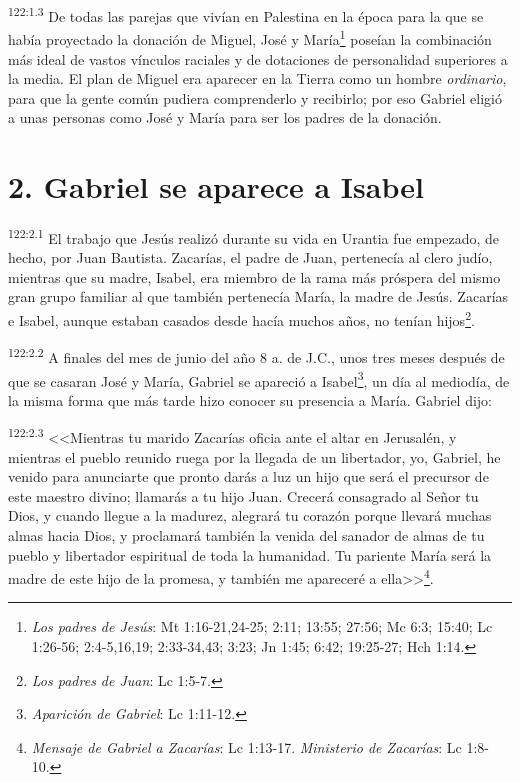 \par 
\textsuperscript{122:1.3} De todas las parejas que vivían en Palestina en la época para la que se había proyectado la donación de Miguel, José y María\footnote{\textit{Los padres de Jesús}: Mt 1:16-21,24-25; 2:11; 13:55; 27:56; Mc 6:3; 15:40; Lc 1:26-56; 2:4-5,16,19; 2:33-34,43; 3:23; Jn 1:45; 6:42; 19:25-27; Hch 1:14.} poseían la combinación más ideal de vastos vínculos raciales y de dotaciones de personalidad superiores a la media. El plan de Miguel era aparecer en la Tierra como un hombre \textit{ordinario}, para que la gente común pudiera comprenderlo y recibirlo; por eso Gabriel eligió a unas personas como José y María para ser los padres de la donación.

\section*{2. Gabriel se aparece a Isabel}
\par 
\textsuperscript{122:2.1} El trabajo que Jesús realizó durante su vida en Urantia fue empezado, de hecho, por Juan Bautista. Zacarías, el padre de Juan, pertenecía al clero judío, mientras que su madre, Isabel, era miembro de la rama más próspera del mismo gran grupo familiar al que también pertenecía María, la madre de Jesús. Zacarías e Isabel, aunque estaban casados desde hacía muchos años, no tenían hijos\footnote{\textit{Los padres de Juan}: Lc 1:5-7.}.

\par 
\textsuperscript{122:2.2} A finales del mes de junio del año 8 a. de J.C., unos tres meses después de que se casaran José y María, Gabriel se apareció a Isabel\footnote{\textit{Aparición de Gabriel}: Lc 1:11-12.}, un día al mediodía, de la misma forma que más tarde hizo conocer su presencia a María. Gabriel dijo:

\par 
\textsuperscript{122:2.3} <<Mientras tu marido Zacarías oficia ante el altar en Jerusalén, y mientras el pueblo reunido ruega por la llegada de un libertador, yo, Gabriel, he venido para anunciarte que pronto darás a luz un hijo que será el precursor de este maestro divino; llamarás a tu hijo Juan. Crecerá consagrado al Señor tu Dios, y cuando llegue a la madurez, alegrará tu corazón porque llevará muchas almas hacia Dios, y proclamará también la venida del sanador de almas de tu pueblo y libertador espiritual de toda la humanidad. Tu pariente María será la madre de este hijo de la promesa, y también me apareceré a ella>>\footnote{\textit{Mensaje de Gabriel a Zacarías}: Lc 1:13-17. \textit{Ministerio de Zacarías}: Lc 1:8-10.}.

